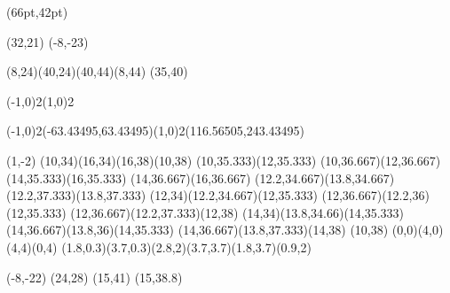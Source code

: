 

\PapierGroesse(66pt,42pt)

\parskip=0pt

\begin{psfigur}[scale=2](32,21)
\psPin(-8,-23){
\psPolygon[fuellfarbe=0,eckradius=2,linienstil=](8,24)(40,24)(40,44)(8,44)
\psPin(35,40){\psKreis[fuellfarbe=1:0:0,linienstil=](-1,0){2}\psKreis[fuellfarbe=1:1:0,linienstil=](1,0){2}\begin{psGebiet}[fuellfarbe=1:0.5:0,weg=geschlossen]\psKreisbogen(-1,0){2}(-63.43495,63.43495)\psKreisbogen(1,0){2}(116.56505,243.43495)\end{psGebiet}}
\psPin(1,-2){
\psPolygon[fuellfarbe=0.77:0.77:0.75,eckradius=1,linienstil=](10,34)(16,34)(16,38)(10,38)
\psLinie(10,35.333)(12,35.333)
\psLinie(10,36.667)(12,36.667)
\psLinie(14,35.333)(16,35.333)
\psLinie(14,36.667)(16,36.667)
\psLinie(12.2,34.667)(13.8,34.667)
\psLinie(12.2,37.333)(13.8,37.333)
\psKurve(12,34)(12.2,34.667)(12,35.333)
\psKurve(12,36.667)(12.2,36)(12,35.333)
\psKurve(12,36.667)(12.2,37.333)(12,38)
\psKurve(14,34)(13.8,34.66)(14,35.333)
\psKurve(14,36.667)(13.8,36)(14,35.333)
\psKurve(14,36.667)(13.8,37.333)(14,38)
}
\psPin(10,38){
\psPolygon[farbe=1,linienbreite=0.2,linienstil=-](0,0)(4,0)(4,4)(0,4)
\psPolygon[fuellfarbe=1](1.8,0.3)(3.7,0.3)(2.8,2)(3.7,3.7)(1.8,3.7)(0.9,2)
}
}
\psNeueSchicht
\psPin(-8,-22){
\rpin(24,28){}
\tpin[r=0](15,41){}
\tpin[r=0](15,38.8){}
}
\end{psfigur}


